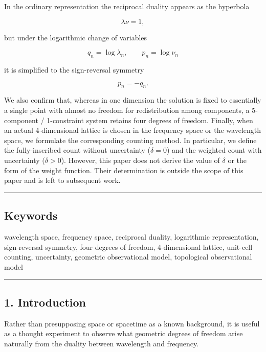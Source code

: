 \documentclass[
]{article}
\begin{document}
In the ordinary representation the reciprocal duality appears as the
hyperbola

\[
\lambda\nu=1 ,
\]

but under the logarithmic change of variables

\[
q_n=\log \lambda_n,\qquad p_n=\log \nu_n
\]

it is simplified to the sign-reversal symmetry

\[
p_n=-q_n .
\]

We also confirm that, whereas in one dimension the solution is fixed to
essentially a single point with almost no freedom for redistribution
among components, a 5-component / 1-constraint system retains four
degrees of freedom. Finally, when an actual 4-dimensional lattice is
chosen in the frequency space or the wavelength space, we formulate the
corresponding counting method. In particular, we define the
fully-inscribed count without uncertainty (\(\delta=0\)) and the
weighted count with uncertainty (\(\delta>0\)). However, this paper does
not derive the value of \(\delta\) or the form of the weight function.
Their determination is outside the scope of this paper and is left to
subsequent work.

\begin{center}\rule{0.5\linewidth}{0.5pt}\end{center}

\subsection{Keywords}\label{keywords}

wavelength space, frequency space, reciprocal duality, logarithmic
representation, sign-reversal symmetry, four degrees of freedom,
4-dimensional lattice, unit-cell counting, uncertainty, geometric
observational model, topological observational model

\begin{center}\rule{0.5\linewidth}{0.5pt}\end{center}

\subsection{1. Introduction}\label{introduction}

Rather than presupposing space or spacetime as a known background, it is
useful as a thought experiment to observe what geometric degrees of
freedom arise naturally from the duality between wavelength and
frequency.
\end{document}

